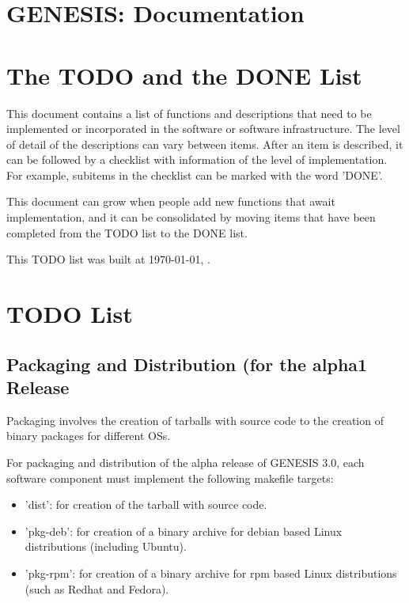 \documentclass[12pt]{article}
\begin{document}
\section*{GENESIS: Documentation}

\section{The TODO and the DONE List}

This document contains a list of functions and descriptions that need
to be implemented or incorporated in the software or software
infrastructure.  The level of detail of the descriptions can vary
between items.  After an item is described, it can be followed by a
checklist with information of the level of implementation.  For
example, subitems in the checklist can be marked with the word 'DONE'.

This document can grow when people add new functions that await
implementation, and it can be consolidated by moving items that have
been completed from the TODO list to the DONE list.

This TODO list was built at \today, \thistime.


\section{TODO List}

\subsection{Packaging and Distribution (for the alpha1 Release}

Packaging involves the creation of tarballs with source code to the
creation of binary packages for different OSs.

For packaging and distribution of the alpha release of GENESIS 3.0,
each software component must implement the following makefile targets:

\begin{itemize}
\item 'dist': for creation of the tarball with source code.
\item 'pkg-deb': for creation of a binary archive for debian based
  Linux distributions (including Ubuntu).
\item 'pkg-rpm': for creation of a binary archive for rpm based Linux
  distributions (such as Redhat and Fedora).
\end{itemize}
\end{document}
